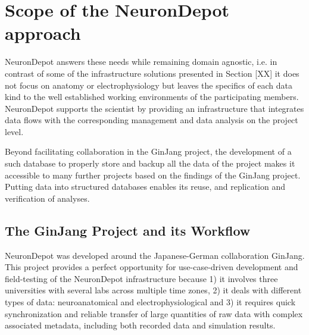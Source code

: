 \documentclass{frontiersSCNS} %
\begin{document}

\section{Scope of the NeuronDepot approach}

NeuronDepot answers these needs while remaining domain agnostic, i.e. in
contrast of some of the infrastructure solutions presented in Section [XX] it
does not focus on anatomy or electrophysiology but leaves the specifics of each
data kind to the well established working environments of the participating
members. NeuronDepot supports the scientist by providing an infrastructure that
integrates data flows with the corresponding management and data analysis on
the project level.

Beyond facilitating collaboration in the GinJang project,  the development of a
such database to properly store and backup all the data of the project makes it
accessible to many further projects based on the findings of the GinJang
project. Putting data into structured databases enables its reuse, and
replication and verification of analyses.

\subsection{The GinJang Project and its Workflow}

NeuronDepot was developed around the Japanese-German collaboration GinJang.
This project provides a perfect opportunity for use-case-driven development and
field-testing of the NeuronDepot infrastructure because 1) it involves three
universities with several labs across multiple time zones, 2) it deals with
different types of data: neuroanatomical and electrophysiological and 3) it
requires quick synchronization and reliable transfer of large quantities of raw
data with complex associated metadata, including both recorded data and
simulation results.
\end{document}
